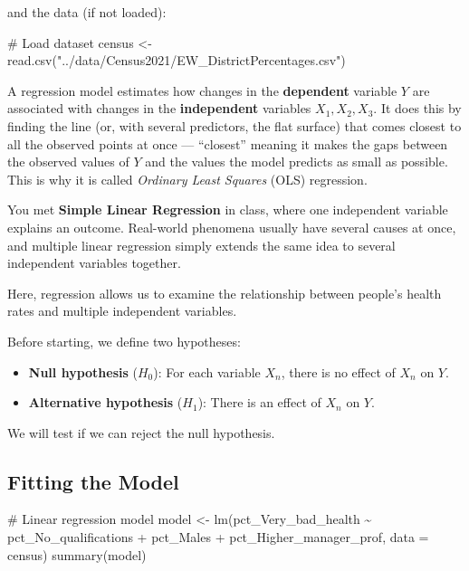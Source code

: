 \documentclass[
  letterpaper,
  DIV=11,
  numbers=noendperiod]{scrreprt}
\newenvironment{Shaded}{\begin{snugshade}}{\end{snugshade}}
\newcommand{\AttributeTok}[1]{\textcolor[rgb]{0.40,0.45,0.13}{#1}}
\newcommand{\CommentTok}[1]{\textcolor[rgb]{0.37,0.37,0.37}{#1}}
\newcommand{\FunctionTok}[1]{\textcolor[rgb]{0.28,0.35,0.67}{#1}}
\newcommand{\NormalTok}[1]{\textcolor[rgb]{0.00,0.23,0.31}{#1}}
\newcommand{\OtherTok}[1]{\textcolor[rgb]{0.00,0.23,0.31}{#1}}
\newcommand{\SpecialCharTok}[1]{\textcolor[rgb]{0.37,0.37,0.37}{#1}}
\newcommand{\StringTok}[1]{\textcolor[rgb]{0.13,0.47,0.30}{#1}}
\providecommand{\tightlist}{%
  \setlength{\itemsep}{0pt}\setlength{\parskip}{0pt}}
\begin{document}
and the data (if not loaded):

\begin{Shaded}
\begin{Highlighting}[]
\CommentTok{\# Load dataset}
\NormalTok{census }\OtherTok{\textless{}{-}} \FunctionTok{read.csv}\NormalTok{(}\StringTok{"../data/Census2021/EW\_DistrictPercentages.csv"}\NormalTok{)}
\end{Highlighting}
\end{Shaded}

A regression model estimates how changes in the \textbf{dependent}
variable \(Y\) are associated with changes in the \textbf{independent}
variables \(X_1, X_2, X_3\). It does this by finding the line (or, with
several predictors, the flat surface) that comes closest to all the
observed points at once --- ``closest'' meaning it makes the gaps
between the observed values of \(Y\) and the values the model predicts
as small as possible. This is why it is called \emph{Ordinary Least
Squares} (OLS) regression.

You met \textbf{Simple Linear Regression} in class, where one
independent variable explains an outcome. Real-world phenomena usually
have several causes at once, and multiple linear regression simply
extends the same idea to several independent variables together.

Here, regression allows us to examine the relationship between people's
health rates and multiple independent variables.

Before starting, we define two hypotheses:

\begin{itemize}
\tightlist
\item
  \textbf{Null hypothesis} (\(H_0\)): For each variable \(X_n\), there
  is no effect of \(X_n\) on \(Y\).
\item
  \textbf{Alternative hypothesis} (\(H_1\)): There is an effect of
  \(X_n\) on \(Y\).
\end{itemize}

We will test if we can reject the null hypothesis.

\subsection{Fitting the Model}\label{fitting-the-model}

\begin{Shaded}
\begin{Highlighting}[]
\CommentTok{\# Linear regression model}
\NormalTok{model }\OtherTok{\textless{}{-}} \FunctionTok{lm}\NormalTok{(pct\_Very\_bad\_health }\SpecialCharTok{\textasciitilde{}}\NormalTok{ pct\_No\_qualifications }\SpecialCharTok{+}\NormalTok{ pct\_Males }\SpecialCharTok{+}\NormalTok{ pct\_Higher\_manager\_prof, }\AttributeTok{data =}\NormalTok{ census)}
\FunctionTok{summary}\NormalTok{(model)}
\end{Highlighting}
\end{Shaded}
\end{document}
